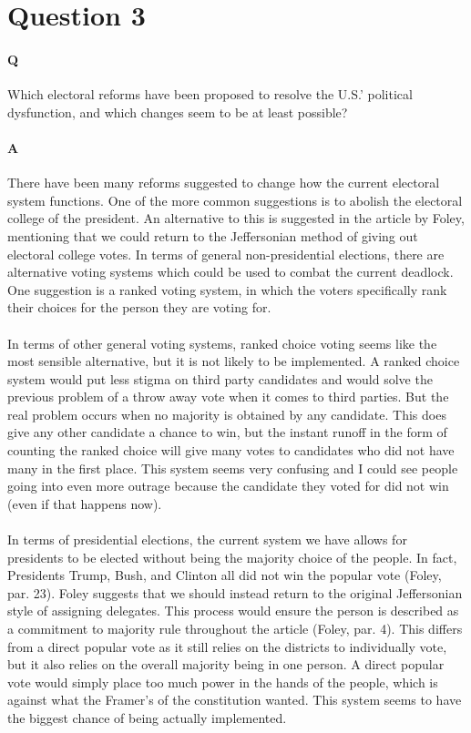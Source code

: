 \documentclass[12pt]{article}
\begin{document}
\section*{Question 3}
\paragraph{Q}
Which electoral reforms have been proposed to resolve the U.S.’ political
dysfunction, and which changes seem to be at least possible? 
\paragraph{A}
There have been many reforms suggested to change how the current
electoral system functions. One of the more common suggestions is to
abolish the electoral college of the president. An alternative to this
is suggested in the article by Foley, mentioning that we could return
to the Jeffersonian method of giving out electoral college votes. In
terms of general non-presidential elections, there are alternative
voting systems which could be used to combat the current deadlock. One
suggestion is a ranked voting system, in which the voters specifically
rank their choices for the person they are voting for.
\paragraph{}
In terms of other general voting systems, ranked choice voting seems
like the most sensible alternative, but it is not likely to be
implemented. A ranked choice system would put less stigma on third
party candidates and would solve the previous problem of a throw away
vote when it comes to third parties. But the real problem occurs when
no majority is obtained by any candidate. This does give any other
candidate a chance to win, but the instant runoff in the form of
counting the ranked choice will give many votes to candidates who did
not have many in the first place. This system seems very confusing and
I could see people going into even more outrage because the candidate
they voted for did not win (even if that happens now). 
\paragraph{}
In terms of presidential elections, the current system we have allows
for presidents to be elected without being the majority choice of the
people. In fact, Presidents Trump, Bush, and Clinton all did not win
the popular vote (Foley, par. 23). Foley suggests that we should
instead return to the original Jeffersonian style of assigning
delegates. This process would ensure the person is described as a
commitment to majority rule throughout the article (Foley,
par. 4). This differs from a direct popular vote as it still relies on
the districts to individually vote, but it also relies on the overall
majority being in one person. A direct popular vote would simply place
too much power in the hands of the people, which is against what the
Framer's of the constitution wanted. This system seems to have the
biggest chance of being actually implemented.
\end{document}
